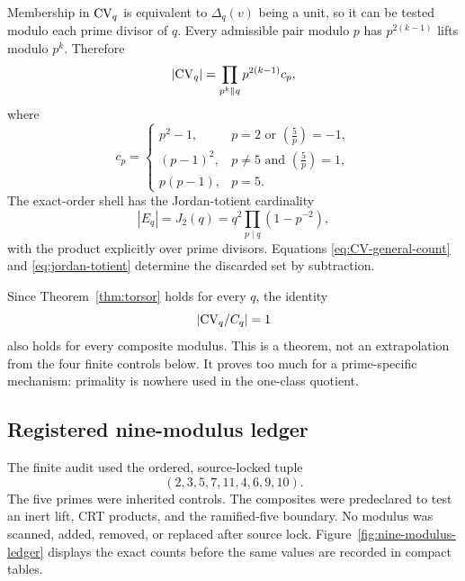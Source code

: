 \documentclass[11pt]{article}
\theoremstyle{definition}
\theoremstyle{remark}
\begin{document}
Membership in \(\mathrm{CV}_q\) is equivalent to \(\Delta_q(v)\) being a unit, so
it can be tested modulo each prime divisor of \(q\).  Every admissible pair
modulo \(p\) has \(p^{2(k-1)}\) lifts modulo \(p^k\).  Therefore
\begin{equation}
  |\mathrm{CV}_q|
  =\prod_{p^k\parallel q}p^{2(k-1)}c_p,
  \label{eq:CV-general-count}
\end{equation}
where
\begin{equation}
  c_p=
  \begin{cases}
    p^2-1,&p=2\text{ or }\left(\frac5p\right)=-1,\\
    (p-1)^2,&p\ne5\text{ and }\left(\frac5p\right)=1,\\
    p(p-1),&p=5.
  \end{cases}
  \label{eq:local-CV-count}
\end{equation}
The exact-order shell has the Jordan-totient cardinality
\begin{equation}
  |E_q|=J_2(q)=q^2\prod_{p\mid q}(1-p^{-2}),
  \label{eq:jordan-totient}
\end{equation}
with the product explicitly over prime divisors.  Equations
\eqref{eq:CV-general-count} and \eqref{eq:jordan-totient} determine the
discarded set by subtraction.

Since Theorem~\ref{thm:torsor} holds for every \(q\), the identity
\begin{equation}
  |\mathrm{CV}_q/C_q|=1
  \label{eq:all-q-one-class}
\end{equation}
also holds for every composite modulus.  This is a theorem, not an
extrapolation from the four finite controls below.  It proves too much for a
prime-specific mechanism: primality is nowhere used in the one-class
quotient.

\subsection{Registered nine-modulus ledger}

The finite audit used the ordered, source-locked tuple
\begin{equation}
  (2,3,5,7,11,4,6,9,10).
  \label{eq:frozen-moduli}
\end{equation}
The five primes were inherited controls.  The composites were predeclared
to test an inert lift, CRT products, and the ramified-five boundary.  No
modulus was scanned, added, removed, or replaced after source lock.
Figure~\ref{fig:nine-modulus-ledger} displays the exact counts before the
same values are recorded in compact tables.
\end{document}
